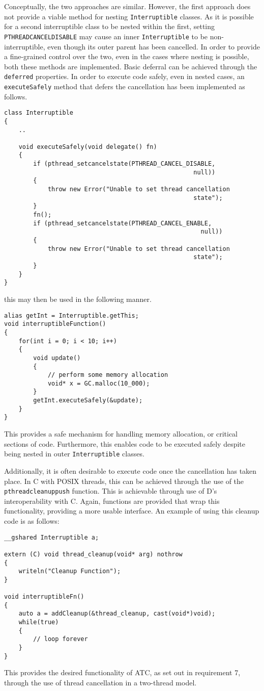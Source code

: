 Conceptually, the two approaches are similar. However, the first approach does 
not provide a viable method for nesting \texttt{Interruptible} classes. As it is 
possible for a second interruptible class to be nested within the first, setting 
\texttt{PTHREAD\textunderscore{}CANCEL\textunderscore{}DISABLE} may cause an 
inner \texttt{Interruptible} to be non-interruptible, even though its outer parent 
has been cancelled. In order to provide a fine-grained control over the two, 
even in the cases where nesting is possible, both these methods are implemented. 
Basic deferral can be achieved through the \texttt{deferred} properties. In order 
to execute code safely, even in nested cases, an \texttt{executeSafely} method that 
defers the cancellation has been implemented as follows. 
\begin{lstlisting}
class Interruptible
{
    ..

    void executeSafely(void delegate() fn)
    {
        if (pthread_setcancelstate(PTHREAD_CANCEL_DISABLE, 
                                                    null))
        {
            throw new Error("Unable to set thread cancellation 
                                                    state");
        }
        fn();
        if (pthread_setcancelstate(PTHREAD_CANCEL_ENABLE, 
                                                      null))
        {
            throw new Error("Unable to set thread cancellation 
                                                    state");
        }
    }
}
\end{lstlisting}
this may then be used in the following manner. 
\begin{lstlisting}
alias getInt = Interruptible.getThis;
void interruptibleFunction() 
{
    for(int i = 0; i < 10; i++)
    {
        void update() 
        {
            // perform some memory allocation
            void* x = GC.malloc(10_000); 
        }
        getInt.executeSafely(&update);
    }
}
\end{lstlisting}
This provides a safe mechanism for handling memory allocation, or critical sections 
of code. Furthermore, this enables code to be executed safely despite being 
nested in outer \texttt{Interruptible} classes. 
\par\bigskip\noindent
Additionally, it is often desirable to execute code once the cancellation has taken 
place. In C with POSIX threads, this can be achieved through the use of the 
\texttt{pthread\textunderscore{}cleanup\textunderscore{}push} function. 
This is achievable through use of D's interoperability with C. Again, functions are provided 
that wrap this functionality, providing a more usable interface. An example of using 
this cleanup code is as follows: 
\begin{lstlisting}
__gshared Interruptible a; 

extern (C) void thread_cleanup(void* arg) nothrow
{
    writeln("Cleanup Function");
}

void interruptibleFn()
{
    auto a = addCleanup(&thread_cleanup, cast(void*)void);
    while(true)
    {
        // loop forever
    }
}
\end{lstlisting}
This provides the desired functionality of ATC, as set out in requirement 7, 
through the use of thread cancellation in a two-thread model.

